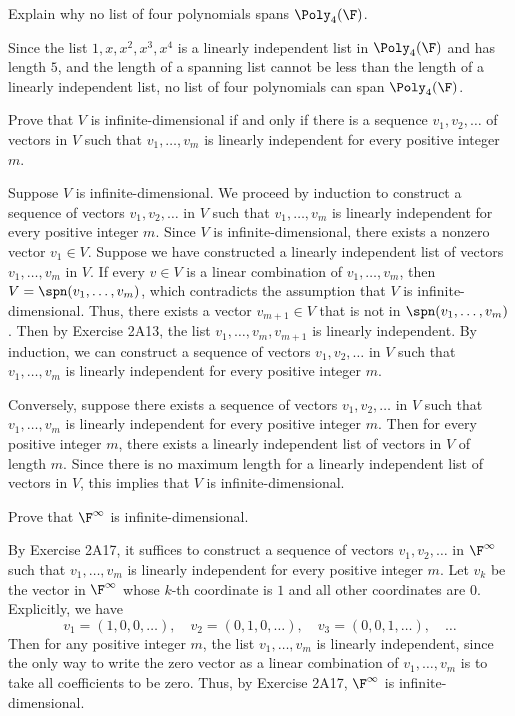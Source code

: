 \begin{exercise}
Explain why no list of four polynomials spans $\Poly_4(\F)$.
\end{exercise}
\begin{solution}
Since the list $1,x,x^2,x^3,x^4$ is a linearly independent list in
$\Poly_4(\F)$ and has length $5$, and the length of a spanning list cannot be
less than the length of a linearly independent list, no list of four
polynomials can span $\Poly_4(\F)$.
\end{solution}

\begin{exercise}
Prove that $V$ is infinite-dimensional if and only if there is a sequence
$v_1,v_2,\dots$ of vectors in $V$ such that $v_1,\dots,v_m$ is linearly
independent for every positive integer $m$.
\end{exercise}
\begin{solution}
Suppose $V$ is infinite-dimensional. We proceed by induction to construct a
sequence of vectors $v_1,v_2,\dots$ in $V$ such that $v_1,\dots,v_m$ is
linearly independent for every positive integer $m$. Since $V$ is
infinite-dimensional, there exists a nonzero vector $v_1\in V$. Suppose we have
constructed a linearly independent list of vectors $v_1,\dots,v_m$ in $V$. If
every $v\in V$ is a linear combination of $v_1,\dots,v_m$, then
$V=\spn(v_1,\dots,v_m)$, which contradicts the assumption that $V$ is
infinite-dimensional. Thus, there exists a vector $v_{m+1}\in V$ that is not in
$\spn(v_1,\dots,v_m)$. Then by Exercise 2A13, the list
$v_1,\dots,v_m,v_{m+1}$ is linearly independent. By induction, we can construct
a sequence of vectors $v_1,v_2,\dots$ in $V$ such that $v_1,\dots,v_m$ is
linearly independent for every positive integer $m$.

Conversely, suppose there exists a sequence of vectors $v_1,v_2,\dots$ in $V$
such that $v_1,\dots,v_m$ is linearly independent for every positive integer
$m$. Then for every positive integer $m$, there exists a linearly independent
list of vectors in $V$ of length $m$. Since there is no maximum length for a
linearly independent list of vectors in $V$, this implies that $V$ is
infinite-dimensional.
\end{solution}

\begin{exercise}
Prove that $\F^\infty$ is infinite-dimensional.
\end{exercise}
\begin{solution}
By Exercise 2A17, it suffices to construct a sequence of vectors
$v_1,v_2,\dots$ in $\F^\infty$ such that $v_1,\dots,v_m$ is linearly
independent for every positive integer $m$. Let $v_k$ be the vector in
$\F^\infty$ whose $k$-th coordinate is $1$ and all other coordinates are $0$.
Explicitly, we have
\[ v_1=(1,0,0,\dots), \quad v_2=(0,1,0,\dots), \quad v_3=(0,0,1,\dots),
   \quad \dots \]
Then for any positive integer $m$, the list $v_1,\dots,v_m$ is linearly
independent, since the only way to write the zero vector as a linear
combination of $v_1,\dots,v_m$ is to take all coefficients to be zero. Thus,
by Exercise 2A17, $\F^\infty$ is infinite-dimensional.
\end{solution}


